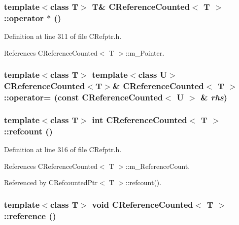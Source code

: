 \subsubsection{\setlength{\rightskip}{0pt plus 5cm}template$<$class T$>$ T\& CReference\-Counted$<$ T $>$::operator $\ast$ ()\hspace{0.3cm}{\tt  [inline]}}\label{classCReferenceCounted_a2}




Definition at line 311 of file CRefptr.h.

References CReference\-Counted$<$ T $>$::m\_\-Pointer.
\subsubsection{\setlength{\rightskip}{0pt plus 5cm}template$<$class T$>$ template$<$class U$>$ CReference\-Counted$<$T$>$\& CReference\-Counted$<$ T $>$::operator= (const CReference\-Counted$<$ U $>$ \& {\em rhs})\hspace{0.3cm}{\tt  [private]}}\label{classCReferenceCounted_c0}


\subsubsection{\setlength{\rightskip}{0pt plus 5cm}template$<$class T$>$ int CReference\-Counted$<$ T $>$::refcount ()\hspace{0.3cm}{\tt  [inline]}}\label{classCReferenceCounted_a7}




Definition at line 316 of file CRefptr.h.

References CReference\-Counted$<$ T $>$::m\_\-Reference\-Count.

Referenced by CRefcounted\-Ptr$<$ T $>$::refcount().
\subsubsection{\setlength{\rightskip}{0pt plus 5cm}template$<$class T$>$ void CReference\-Counted$<$ T $>$::reference ()\hspace{0.3cm}{\tt  [inline]}}\label{classCReferenceCounted_a4}




